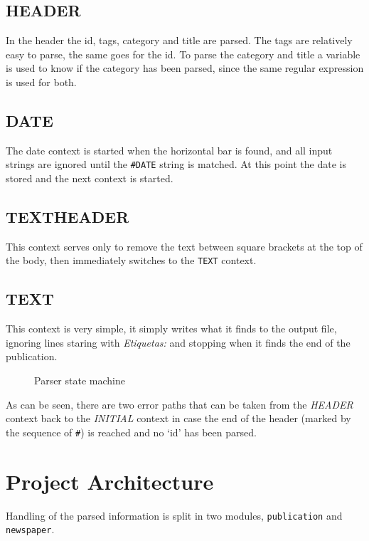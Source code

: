 \documentclass[a4paper]{report}
\begin{document}
\subsection{HEADER}

In the header the id, tags, category and title are parsed. The tags are
relatively easy to parse, the same goes for the id. To parse the category and
title a variable is used to know if the category has been parsed, since the
same regular expression is used for both.

\subsection{DATE}

The date context is started when the horizontal bar is found, and all input
strings are ignored until the \texttt{\#DATE} string is matched. At this point
the date is stored and the next context is started.

\subsection{TEXTHEADER}

This context serves only to remove the text between square brackets at the top
of the body, then immediately switches to the \texttt{TEXT} context.

\subsection{TEXT}

This context is very simple, it simply writes what it finds to the output file,
ignoring lines staring with \textit{Etiquetas:} and stopping when it finds the
end of the publication.

\begin{figure}[H]
    
    \caption{Parser state machine}
\end{figure}

As can be seen, there are two error paths that can be taken from the
\textit{HEADER} context back to the \textit{INITIAL} context in case the end of
the header (marked by the sequence of \verb!#!) is reached and no `id' has been
parsed.

\section{Project Architecture}

Handling of the parsed information is split in two modules,
\texttt{publication} and \texttt{newspaper}.
\end{document}
